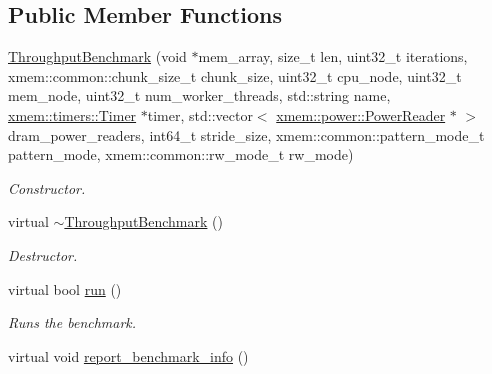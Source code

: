 \subsection*{Public Member Functions}
\begin{DoxyCompactItemize}
\item 
\hyperlink{classxmem_1_1benchmark_1_1_throughput_benchmark_a7f6fcc030500ebd3aed37d7eacea68dc}{Throughput\-Benchmark} (void $\ast$mem\-\_\-array, size\-\_\-t len, uint32\-\_\-t iterations, xmem\-::common\-::chunk\-\_\-size\-\_\-t chunk\-\_\-size, uint32\-\_\-t cpu\-\_\-node, uint32\-\_\-t mem\-\_\-node, uint32\-\_\-t num\-\_\-worker\-\_\-threads, std\-::string name, \hyperlink{classxmem_1_1timers_1_1_timer}{xmem\-::timers\-::\-Timer} $\ast$timer, std\-::vector$<$ \hyperlink{classxmem_1_1power_1_1_power_reader}{xmem\-::power\-::\-Power\-Reader} $\ast$ $>$ dram\-\_\-power\-\_\-readers, int64\-\_\-t stride\-\_\-size, xmem\-::common\-::pattern\-\_\-mode\-\_\-t pattern\-\_\-mode, xmem\-::common\-::rw\-\_\-mode\-\_\-t rw\-\_\-mode)
\begin{DoxyCompactList}\small\item\em Constructor. \end{DoxyCompactList}\item 
\hypertarget{classxmem_1_1benchmark_1_1_throughput_benchmark_ad4adc2b57b501862bfa415c4adfdef7e}{virtual \hyperlink{classxmem_1_1benchmark_1_1_throughput_benchmark_ad4adc2b57b501862bfa415c4adfdef7e}{$\sim$\-Throughput\-Benchmark} ()}\label{classxmem_1_1benchmark_1_1_throughput_benchmark_ad4adc2b57b501862bfa415c4adfdef7e}

\begin{DoxyCompactList}\small\item\em Destructor. \end{DoxyCompactList}\item 
virtual bool \hyperlink{classxmem_1_1benchmark_1_1_throughput_benchmark_a9f113e51d980830582148eb05c8810a3}{run} ()
\begin{DoxyCompactList}\small\item\em Runs the benchmark. \end{DoxyCompactList}\item 
\hypertarget{classxmem_1_1benchmark_1_1_throughput_benchmark_aab821d4beb68616c5a939bc2e493426e}{virtual void \hyperlink{classxmem_1_1benchmark_1_1_throughput_benchmark_aab821d4beb68616c5a939bc2e493426e}{report\-\_\-benchmark\-\_\-info} ()}\label{classxmem_1_1benchmark_1_1_throughput_benchmark_aab821d4beb68616c5a939bc2e493426e}


\end{DoxyCompactItemize}

